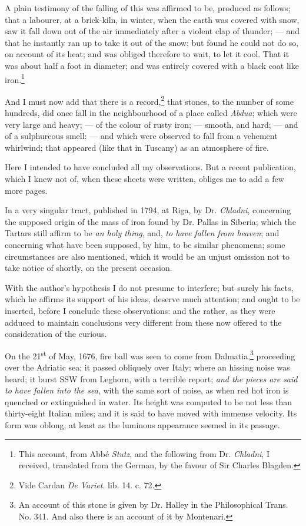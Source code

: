\documentclass[a4paper, 12pt, oneside]{article}
\begin{document}
A plain testimony of the falling of this was affirmed to be, produced as follows; that a labourer, at a brick-kiln, in winter, when the earth was covered with snow, saw it fall down out of the air immediately after a violent clap of thunder; --- and that he instantly ran up to take it out of the snow; but found he could not do so, on account of its heat; and was obliged therefore to wait, to let it cool. That it was about half a foot in diameter; and was entirely covered with a black coat like iron.\footnote{This account, from Abbé \emph{Stutz}, and the following from Dr. \emph{Chladni}, I received, translated from the German, by the favour of Sir Charles Blagden.}

And I must now add that there is a record,\footnote{Vide Cardan \emph{De Variet}. lib. 14. c. 72.} that stones, to the number of some hundreds, did once fall in the neighbourhood of a place called \emph{Abdua}; which were very large and heavy; --- of the colour of rusty iron; --- smooth, and hard; --- and of a sulphureous smell: --- and which were observed to fall from a vehement whirlwind; that appeared (like that in Tuscany) as an atmosphere of fire.

Here I intended to have concluded all my observations. But a recent publication, which I knew not of, when these sheets were written, obliges me to add a few more pages.

In a very singular tract, published in 1794, at Riga, by Dr. \emph{Chladni}, concerning the supposed origin of the mass of iron found by Dr. Pallas in Siberia; which the Tartars still affirm to be \emph{an holy thing}, and, \emph{to have fallen from heaven}; and concerning what have been supposed, by him, to be similar phenomena; some circumstances are also mentioned, which it would be an unjust omission not to take notice of shortly, on the present occasion.

With the author's hypothesis I do not presume to interfere; but surely his facts, which he affirms its support of his ideas, deserve much attention; and ought to be inserted, before I conclude these observations: and the rather, as they were adduced to maintain conclusions very different from these now offered to the consideration of the curious.

On the 21\textsuperscript{st} of May, 1676, fire ball was seen to come from Dalmatia,\footnote{An account of this stone is given by Dr. Halley in the Philosophical Trans. No. 341. And also there is an account of it by Montenari.} proceeding over the Adriatic sea; it passed obliquely over Italy; where an hissing noise was heard; it burst SSW from Leghorn, with a terrible report; \emph{and the pieces are said to have fallen into the sea}, with the same sort of noise, as when red hot iron is quenched or extinguished in water. Its height was computed to be not less than thirty-eight Italian miles; and it is said to have moved with immense velocity. Its form was oblong, at least as the luminous appearance seemed in its passage.
\end{document}
